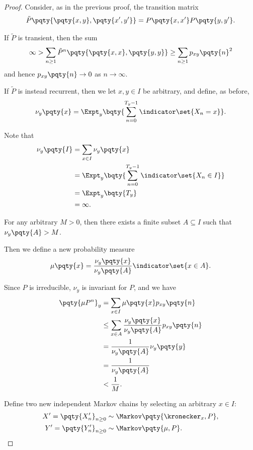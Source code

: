 \begin{proof}
    Consider, as in the previous proof, the transition matrix
    \[
        \tilde{P} \pqty{\pqty{x, y}, \pqty{x', y'}} = P\pqty{x, x'} P\pqty{y, y'}.
    \]

    If \(\tilde{P}\) is transient, then the sum
    \[
        \infty > \sum_{n \geq 1} \tilde{P}^n \pqty{\pqty{x, x}, \pqty{y, y}} \geq \sum_{n \geq 1} p_{xy}\pqty{n}^2
    \]
    and hence \(p_{xy}\pqty{n} \to 0\) as \(n \to \infty\).

    If \(\tilde{P}\) is instead recurrent, then we let \(x, y \in I\) be arbitrary, and define, as before,
    \[
        \nu_y \pqty{x} = \Expt_y \bqty{\sum_{n = 0}^{T_y - 1} \indicator \set{X_n = x}}.
    \]

    Note that
    \begin{align*}
        \nu_y\pqty{I} &= \sum_{x \in I} \nu_y\pqty{x} \\
        &= \Expt_y \bqty{\sum_{n = 0}^{T_y - 1} \indicator \set{X_n \in I}} \\
        &= \Expt_y \bqty{T_y} \\
        &= \infty.
    \end{align*}

    For any arbitrary \(M > 0\), then there exists a finite subset \(A \subseteq I\) such that \(\nu_y\pqty{A} > M\).

    Then we define a new probability measure
    \[
        \mu\pqty{x} = \frac{\nu_y\pqty{x}}{\nu_y \pqty{A}} \indicator \set{x \in A}.
    \]

    Since \(P\) is irreducible, \(\nu_y\) is invariant for \(P\), and we have
    \begin{align*}
        \pqty{\mu P^n}_{y} &= \sum_{x \in I} \mu\pqty{x} p_{xy}\pqty{n} \\
        &\leq \sum_{x \in A} \frac{\nu_y\pqty{x}}{\nu_y\pqty{A}} p_{xy}\pqty{n} \\
        &= \frac{1}{\nu_y\pqty{A}} \nu_y \pqty{y} \\
        &= \frac{1}{\nu_y\pqty{A}} \\
        &< \frac{1}{M}.
    \end{align*}

    Define two new independent Markov chains by selecting an arbitrary \(x \in I\):
    \begin{align*}
        X' = \pqty{X'_n}_{n \geq 0} &\sim \Markov\pqty{\kronecker_x, P}, \\
        Y' = \pqty{Y'_n}_{n \geq 0} &\sim \Markov\pqty{\mu, P}.
    \end{align*}


\end{proof}
